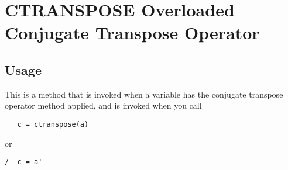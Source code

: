\section{CTRANSPOSE Overloaded Conjugate Transpose Operator}

\subsection{Usage}

This is a method that is invoked when a variable has the
conjugate transpose operator method applied, and is invoked
when you call
\begin{verbatim}
   c = ctranspose(a)
\end{verbatim}
or
\begin{verbatim}
/  c = a'
\end{verbatim}
